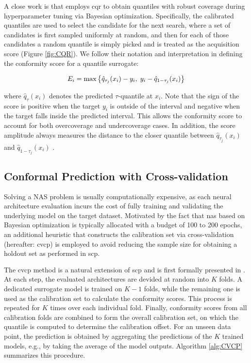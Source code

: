 {\begin{description}[leftmargin=0cm, listparindent=\parindent]
	 A close work is \cite{salinas2023optimizing} that employs \gls{cqr} to obtain quantiles with robust coverage during hyperparameter tuning via Bayesian optimization. Specifically, the calibrated quantiles are used to select the candidate for the next search, where a set of candidates is first sampled uniformly at random, and then for each of those candidates a random quantile is simply picked and is treated as the acquisition score (Figure \ref{fig:CQR}). We follow their notation and interpretation in defining the conformity score for a quantile surrogate:  
	 
	 \begin{equation}
		E_i = \max \big\{\hat{q}_{\tau_j}(x_i) - y_i, \; y_i - \hat{q}_{1-\tau_j}(x_i) \big\}
	 \vspace{0.7em}
	 \label{scoreCQR}
	 \end{equation}
	 
	 \noindent where $\hat{q}_{\tau}(x_i)$ denotes the predicted $\tau$-quantile at $x_i$. Note that the sign of the score is positive when the target $y_i$ is outside of the interval and negative when the target falls inside the predicted interval. This allows the conformity score to account for both overcoverage and undercoverage cases. In addition, the score amplitude always measures the distance to the closer quantile between $\hat{q}_{\tau_j}(x_i)$ and $\hat{q}_{1-\tau_j}(x_i)$ \cite{romano2019conformalized, salinas2023optimizing}.	 

\end{description}


\subsection{Conformal Prediction with Cross-validation}}
Solving a NAS problem is usually computationally expensive, as each neural architecture evaluation incurs the cost of fully training and validating the underlying model on the target dataset. Motivated by the fact that \gls{nas} based on Bayesian optimization is typically allocated with a budget of 100 to 200 epochs, an additional heuristic that constructs the calibration set via cross-validation (hereafter: \gls{cvcp}) is employed to avoid reducing the sample size for obtaining a holdout set as performed in \gls{scp}.

The \gls{cvcp} method is a natural extension of \gls{scp} and is first formally presented in  \cite{vovk2015cross}. At each step, the evaluated architectures are devided at random into $K$ folds. A dedicated surrogate model is trained on $K-1$ folds, while the remaining one is used as the calibration set to calculate the conformity scores. This process is repeated for $K$ times over each individual fold. Finally, conformity scores from all calibration folds are combined to form the overall calibration set, on which the quantile is computed to determine the calibration offset. For an unseen data point, the prediction is obtained by aggregating the predictions of the $K$ trained models, e.g., by taking the average of the model outputs.  Algorithm \ref{alg:CVCP} summarizes this procedure. 

